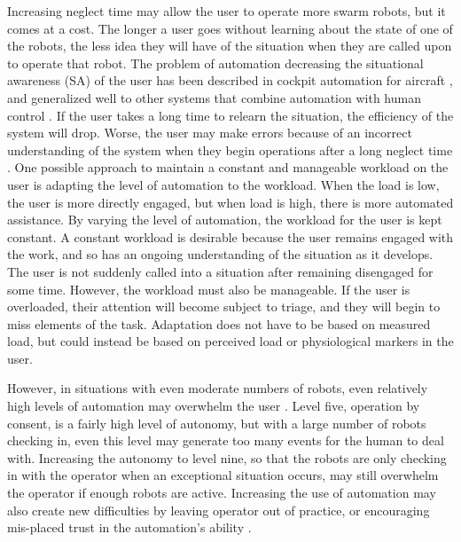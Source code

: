 \documentclass[]{article}
\begin{document}
Increasing neglect time may allow the user to operate more swarm robots, but it comes at a cost. 
The longer a user goes without learning about the state of one of the robots, the less idea they will have of the situation when they are called upon to operate that robot. 
The problem of automation decreasing the situational awareness (SA) of the user has been described in cockpit automation for aircraft \cite{wiener1980flight}, and generalized well to other systems that combine automation with human control \cite{kaber1997out}. 
If the user takes a long time to relearn the situation, the efficiency of the system will drop. 
Worse, the user may make errors because of an incorrect understanding of the system when they begin operations after a long neglect time \cite{cummings2008predicting}. 
One possible approach to maintain a constant and manageable workload on the user is adapting the level of automation to the workload. 
When the load is low, the user is more directly engaged, but when load is high, there is more automated assistance. 
By varying the level of automation, the workload for the user is kept constant. 
A constant workload is desirable because the user remains engaged with the work, and so has an ongoing understanding of the situation as it develops. 
The user is not suddenly called into a situation after remaining disengaged for some time. 
However, the workload must also be manageable. 
If the user is overloaded, their attention will become subject to triage, and they will begin to miss elements of the task. 
Adaptation does not have to be based on measured load, but could instead be based on perceived load or physiological markers in the user. 

However, in situations with even moderate numbers of robots, even relatively high levels of automation may overwhelm the user \cite{lewis200617}. 
Level five, operation by consent, is a fairly high level of autonomy, but with a large number of robots checking in, even this level may generate too many events for the human to deal with. 
Increasing the autonomy to level nine, so that the robots are only checking in with the operator when an exceptional situation occurs, may still overwhelm the operator if enough robots are active.
Increasing the use of automation may also create new difficulties by leaving operator out of practice, or encouraging mis-placed trust in the automation's ability \cite{lee2004trust}. 
\end{document}
